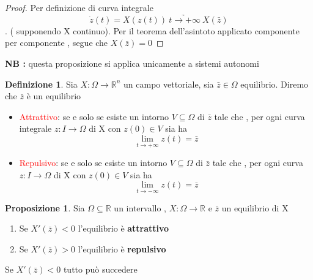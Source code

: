 \documentclass{article}
\theoremstyle{definition}
\newtheorem{definizione}{Definizione}[section]
\newtheorem*{proposizione}{Proposizione}
\newcommand{\R}{\mathbb{R}}
\newcommand{\Rn}{\R^n}
\begin{document}
\begin{proof}
	Per definizione di curva integrale  $$\dot{z}(t)=X(z(t))\ \underrightarrow{t \rightarrow +\infty}\  X(\bar{z})$$. ( supponendo X continuo). Per il teorema dell'asintoto applicato componente per componente , segue che $X(\bar{z})=0$
	\end{proof}
	\textbf{NB :} questa proposizione si applica unicamente a sistemi autonomi
	\begin{definizione}
		Sia $X:\Omega \rightarrow \Rn$ un campo vettoriale, sia $\bar{z} \in \Omega$ equilibrio. Diremo che $\bar{z} $ è un equilibrio 
		\begin{itemize}
			\item \textcolor{red}{Attrattivo}: se e solo se esiste un intorno $V \subseteq \Omega$ di $\bar{z}$ tale che , per ogni curva integrale $z:I \rightarrow \Omega $ di X con $z(0)\in V$ sia ha 
			$$\lim_{t\rightarrow +\infty}z(t)=\bar{z}$$
				\item \textcolor{red}{Repulsivo}: se e solo se esiste un intorno $V \subseteq \Omega$ di $\bar{z}$ tale che , per ogni curva $z:I \rightarrow \Omega $ di X con $z(0)\in V$ sia ha 
			$$\lim_{t\rightarrow -\infty}z(t)=\bar{z}$$
		\end{itemize}
	\end{definizione}
	\begin{proposizione}
		Sia $\Omega \subseteq \R$ un intervallo , $X:\Omega \rightarrow \R$ e $\bar{z}$ un equilibrio di X 
		\begin{enumerate}
			\item Se $X'(\bar{z})<0$ l'equilibrio è \textbf{attrattivo}
			\item Se $X'(\bar{z})>0$ l'equilibrio è \textbf{repulsivo}
		\end{enumerate}
		Se $X'(\bar{z})<0$ tutto può succedere 
	\end{proposizione}
\end{document}
